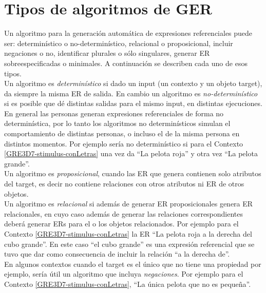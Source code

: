 \section{Tipos de algoritmos de GER}

Un algoritmo para la generaci\'on autom\'atica de expresiones referenciales  puede ser: determin\'{i}stico o no-determin\'{i}stico, relacional o proposicional, incluir negaciones o no, identificar plurales o s\'olo singulares,
generar ER sobreespecificadas o minimales.  A continuaci\'on se describen cada uno de esos tipos.\\

Un algoritmo es {\it determin\'{i}stico} si dado un input (un contexto y un objeto target), da siempre la misma ER de salida. En cambio un algoritmo es {\it no-determin\'{i}stico} si es posible que d\'e distintas salidas para el mismo input, en distintas ejecuciones. En general las personas generan expresiones referenciales de forma no determin\'istica, por lo tanto los algoritmos no determin\'isticos simulan el comportamiento de distintas personas, o incluso el de la misma persona en distintos momentos. Por ejemplo ser\'ia no determin\'istico si para el Contexto \ref{GRE3D7-stimulus-conLetras} una vez da ``La pelota roja'' y otra vez ``La pelota grande''.\\

Un algoritmo es {\it proposicional}, cuando las ER que genera contienen solo atributos del target, es decir no contiene relaciones con otros atributos ni ER de otros objetos.\\

Un algoritmo es {\it relacional} si adem\'as de generar ER proposicionales genera ER relacionales, en cuyo caso adem\'as de generar las relaciones correspondientes deber\'a generar ERs para el o los objetos relacionados. Por ejemplo para el Contexto \ref{GRE3D7-stimulus-conLetras} la ER ``La pelota roja a la derecha del cubo grande''. En este caso ``el cubo grande'' es una expresi\'on referencial que se tuvo que dar como consecuencia de incluir la relaci\'on ``a la derecha de''.\\

En algunos contextos cuando el target es el \'unico que no tiene una propiedad por ejemplo, ser\'ia \'util un algoritmo que incluya {\it negaciones}. Por ejemplo para el Contexto \ref{GRE3D7-stimulus-conLetras}, ``La \'unica pelota que no es peque\~na''.\\

